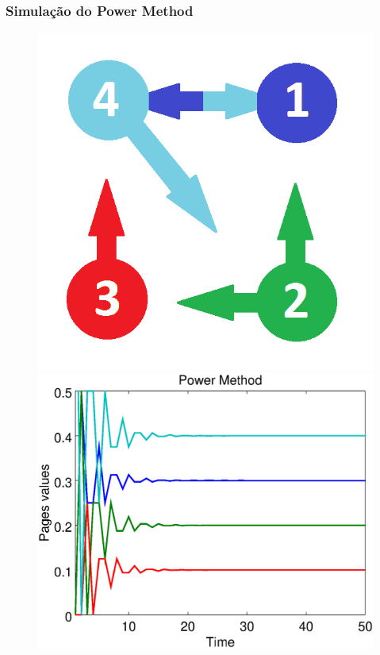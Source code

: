 \documentclass{beamer}
\begin{document}
\begin{frame}
	\frametitle{Simulação do Power Method}
	
\begin{figure}[!htb]
	\centering
	\includegraphics[scale=0.25]{figures/grafo}
	\hspace{0.1cm}
	\includegraphics[scale=0.25]{figures/50/powermetod.eps}

\end{figure}
\end{frame}
\end{document}

